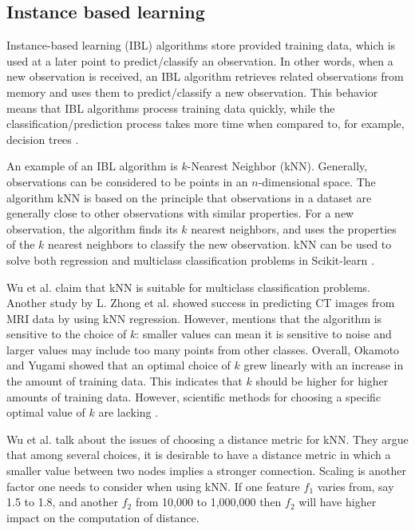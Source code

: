 	\subsection{Instance based learning} \label{sec:knn}
	Instance-based learning (IBL) algorithms store provided training data, which is used at a later point to predict/classify an observation. In other words, when a new observation is received, an IBL algorithm retrieves related observations from memory and uses them to predict/classify a new observation. This behavior means that IBL algorithms process training data quickly, while the classification/prediction process takes more time when compared to, for example, decision trees \cite{ARTICLE:8}. 

	An example of an IBL algorithm is $k$-Nearest Neighbor (kNN). Generally, observations can be considered to be points in an $n$-dimensional space. The algorithm kNN is based on the principle that observations in a dataset are generally close to other observations with similar properties.  For a new observation, the algorithm finds its $k$ nearest neighbors, and uses the properties of the $k$ nearest neighbors to classify the new observation. kNN can be used to solve both regression and multiclass classification problems in Scikit-learn \cite{WEBSITE:17, WEBSITE:18}.

	Wu et al. \cite{ARTICLE:9} claim that kNN is suitable for multiclass classification problems. Another study by L. Zhong et al. \cite{IP:3} showed success in predicting CT images from MRI data by using kNN regression. However, \cite{ARTICLE:9} mentions that the algorithm is sensitive to the choice of $k$: smaller values can mean it is sensitive to noise and larger values may include too many points from other classes. Overall, Okamoto and Yugami \cite{ARTICLE:12} showed that an optimal choice of $k$ grew linearly with an increase in the amount of training data. This indicates that $k$ should be higher for higher amounts of training data. However, scientific methods for choosing a specific optimal value of $k$ are lacking \cite{ARTICLE:7}.

	Wu et al. \cite{ARTICLE:9} talk about the issues of choosing a distance metric for kNN. They argue that among several choices, it is desirable to have a distance metric in which a smaller value between two nodes implies a stronger connection. Scaling is another factor one needs to consider when using kNN. If one feature $f_1$ varies from, say 1.5 to 1.8, and another $f_2$ from 10,000 to 1,000,000 then $f_2$ will have higher impact on the computation of distance. 
	
